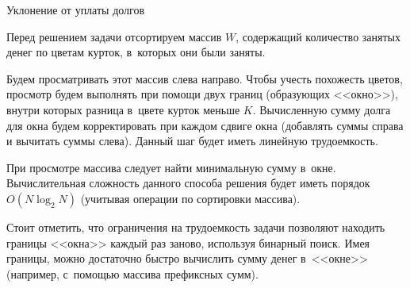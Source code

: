 \begin{tutorial}{Уклонение от уплаты долгов\label{pillstutorial}}

Перед решением задачи отсортируем массив $W$, содержащий количество занятых денег по цветам курток, в~которых они были заняты.

Будем просматривать этот массив слева направо. Чтобы учесть похожесть цветов, просмотр будем выполнять при помощи двух границ (образующих <<окно>>), внутри которых разница в~цвете курток меньше $K$. Вычисленную сумму долга для окна будем корректировать при каждом сдвиге окна (добавлять суммы справа и вычитать суммы слева). Данный шаг будет иметь линейную трудоемкость.

При просмотре массива следует найти минимальную сумму в~окне. Вычислительная сложность данного способа решения будет иметь порядок $O(N \log_2 N)$ (учитывая операции по сортировки массива).

Стоит отметить, что ограничения на трудоемкость задачи позволяют находить границы <<окна>> каждый раз заново, используя бинарный поиск. Имея границы, можно достаточно быстро вычислить сумму денег в~<<окне>> (например, с~помощью массива префиксных сумм).


\end{tutorial}
